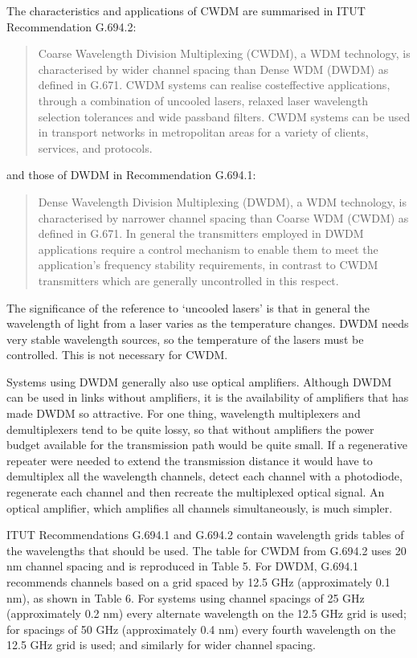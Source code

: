 \documentclass[letterpaper,10pt,english]{sphinxmanual}
\begin{document}
The characteristics and applications of CWDM are summarised in ITU\sphinxhyphen{}T Recommendation G.694.2:


\begin{quote}

Coarse Wavelength Division Multiplexing (CWDM), a WDM technology, is characterised by wider channel spacing than Dense WDM (DWDM) as defined in G.671. CWDM systems can realise cost\sphinxhyphen{}effective applications, through a combination of uncooled lasers, relaxed laser wavelength selection tolerances and wide pass\sphinxhyphen{}band filters. CWDM systems can be used in transport networks in metropolitan areas for a variety of clients, services, and protocols.
\end{quote}

and those of DWDM in Recommendation G.694.1:


\begin{quote}

Dense Wavelength Division Multiplexing (DWDM), a WDM technology, is characterised by narrower channel spacing than Coarse WDM (CWDM) as defined in G.671. In general the transmitters employed in DWDM applications require a control mechanism to enable them to meet the application’s frequency stability requirements, in contrast to CWDM transmitters which are generally uncontrolled in this respect.
\end{quote}

The significance of the reference to ‘uncooled lasers’ is that in general the wavelength of light from a laser varies as the temperature changes. DWDM needs very stable wavelength sources, so the temperature of the lasers must be controlled. This is not necessary for CWDM.

Systems using DWDM generally also use optical amplifiers. Although DWDM can be used in links without amplifiers, it is the availability of amplifiers that has made DWDM so attractive. For one thing, wavelength multiplexers and demultiplexers tend to be quite lossy, so that without amplifiers the power budget available for the transmission path would be quite small. If a regenerative repeater were needed to extend the transmission distance it would have to demultiplex all the wavelength channels,
detect each channel with a photodiode, regenerate each channel and then recreate the multiplexed optical signal. An optical amplifier, which amplifies all channels simultaneously, is much simpler.

ITU\sphinxhyphen{}T Recommendations G.694.1 and G.694.2 contain wavelength grids \textendash{} tables of the wavelengths that should be used. The table for CWDM from G.694.2 uses 20 nm channel spacing and is reproduced in Table 5. For DWDM, G.694.1 recommends channels based on a grid spaced by 12.5 GHz (approximately 0.1 nm), as shown in Table 6. For systems using channel spacings of 25 GHz (approximately 0.2 nm) every alternate wavelength on the 12.5 GHz grid is used; for spacings of 50 GHz (approximately 0.4 nm) every
fourth wavelength on the 12.5 GHz grid is used; and similarly for wider channel spacing.
\end{document}
